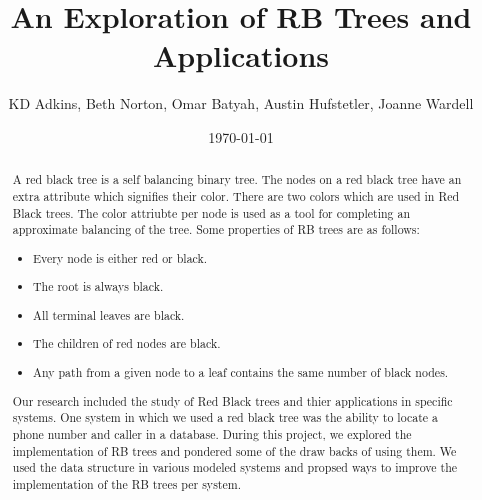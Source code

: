 \documentclass[notitlepage]{report}
\title{An Exploration of RB Trees and Applications}
\author{KD Adkins, Beth Norton, Omar Batyah, Austin Hufstetler, Joanne Wardell}
\date{\today}
\begin{document}
\maketitle
\thispagestyle{empty}

\begin{abstract}
	A red black tree is a self balancing binary tree. The nodes on a red black tree
	have an extra attribute which signifies their color. There are two colors which are
	used in Red Black trees. The color attriubte per node is used as a tool for completing 
	an approximate balancing of the tree. Some properties of RB trees are as follows: 
	\begin{itemize}
		\item Every node is either red or black.
		\item The root is always black.
		\item All terminal leaves are black.
		\item The children of red nodes are black.
		\item Any path from a given node to a leaf contains the same number of black nodes.
	\end{itemize}
	Our research included the study of Red Black trees and thier applications
	in specific systems. One system in which we used 
	a red black tree was the ability to locate a phone number and caller in a database. 
	During this project, we explored the implementation of RB trees 
	and pondered some of the draw backs of using them. We used the data structure 
	in various modeled systems and propsed ways to improve the implementation of 
	the RB trees per system. 
\end{abstract}
\end{document}
